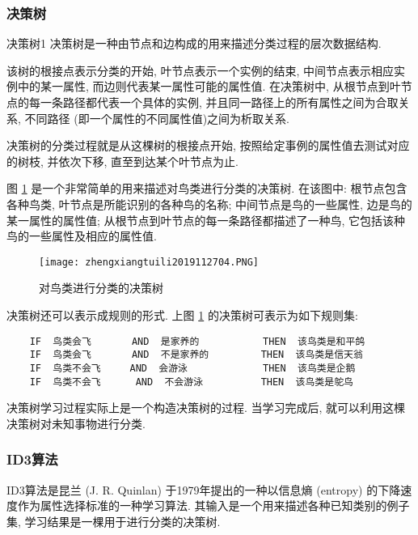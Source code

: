 \subsubsection{决策树}
\begin{mydef}{决策树}{1}
    决策树是一种由节点和边构成的用来描述分类过程的层次数据结构.
\end{mydef}

该树的根接点表示分类的开始, 叶节点表示一个实例的结束, 中间节点表示相应实例中的某一属性, 而边则代表某一属性可能的属性值.
在决策树中, 从根节点到叶节点的每一条路径都代表一个具体的实例, 并且同一路径上的所有属性之间为合取关系, 不同路径 (即一个属性的不同属性值)之间为析取关系.

决策树的分类过程就是从这棵树的根接点开始, 按照给定事例的属性值去测试对应的树枝, 并依次下移, 直至到达某个叶节点为止.

图 \ref{AI32fig2704} 是一个非常简单的用来描述对鸟类进行分类的决策树.
在该图中: 根节点包含各种鸟类, 叶节点是所能识别的各种鸟的名称;
中间节点是鸟的一些属性, 边是鸟的某一属性的属性值;
从根节点到叶节点的每一条路径都描述了一种鸟, 它包括该种鸟的一些属性及相应的属性值.
\begin{figure}[H]
\centering
\texttt{[image: zhengxiangtuili2019112704.PNG]}
\caption{对鸟类进行分类的决策树}
\label{AI32fig2704}
\end{figure}
 决策树还可以表示成规则的形式. 上图 \ref{AI32fig2704} 的决策树可表示为如下规则集:
\begin{Verbatim}
    IF  鸟类会飞       AND  是家养的           THEN  该鸟类是和平鸽
    IF  鸟类会飞       AND  不是家养的         THEN  该鸟类是信天翁
    IF  鸟类不会飞     AND  会游泳             THEN  该鸟类是企鹅
    IF  鸟类不会飞      AND  不会游泳          THEN  该鸟类是鸵鸟
\end{Verbatim}

决策树学习过程实际上是一个构造决策树的过程. 当学习完成后, 就可以利用这棵决策树对未知事物进行分类.
\subsubsection{ID3算法}
ID3算法是昆兰  (J. R. Quinlan) 于1979年提出的一种以信息熵  (entropy) 的下降速度作为属性选择标准的一种学习算法.
其输入是一个用来描述各种已知类别的例子集, 学习结果是一棵用于进行分类的决策树.

